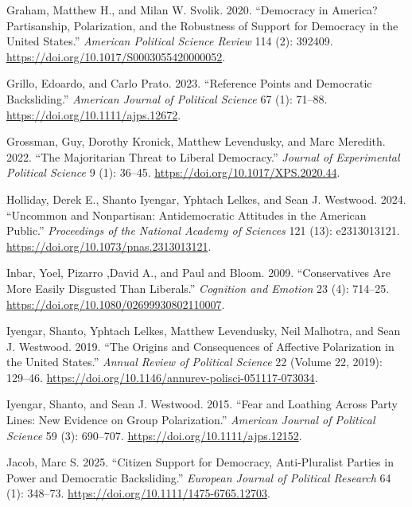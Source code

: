\documentclass[
  10pt,
  letterpaper,
  DIV=11,
  numbers=noendperiod]{scrartcl}
\newlength{\cslhangindent}
\newenvironment{CSLReferences}[2] %
 {\begin{list}{}{%
  \setlength{\itemindent}{0pt}
  \setlength{\leftmargin}{0pt}
  \setlength{\parsep}{0pt}
  \ifodd #1
   \setlength{\leftmargin}{\cslhangindent}
   \setlength{\itemindent}{-1\cslhangindent}
  \fi
  \setlength{\itemsep}{#2\baselineskip}}}
 {\end{list}}
\begin{document}
\begin{CSLReferences}{1}{0}
Graham, Matthew H., and Milan W. Svolik. 2020. {``Democracy in America?
Partisanship, Polarization, and the Robustness of Support for Democracy
in the United States.''} \emph{American Political Science Review} 114
(2): 392409. \url{https://doi.org/10.1017/S0003055420000052}.

Grillo, Edoardo, and Carlo Prato. 2023. {``Reference Points and
Democratic Backsliding.''} \emph{American Journal of Political Science}
67 (1): 71--88. \url{https://doi.org/10.1111/ajps.12672}.

Grossman, Guy, Dorothy Kronick, Matthew Levendusky, and Marc Meredith.
2022. {``The Majoritarian Threat to Liberal Democracy.''} \emph{Journal
of Experimental Political Science} 9 (1): 36--45.
\url{https://doi.org/10.1017/XPS.2020.44}.

Holliday, Derek E., Shanto Iyengar, Yphtach Lelkes, and Sean J.
Westwood. 2024. {``Uncommon and Nonpartisan: Antidemocratic Attitudes in
the American Public.''} \emph{Proceedings of the National Academy of
Sciences} 121 (13): e2313013121.
\url{https://doi.org/10.1073/pnas.2313013121}.

Inbar, Yoel, Pizarro ,David A., and Paul and Bloom. 2009.
{``Conservatives Are More Easily Disgusted Than Liberals.''}
\emph{Cognition and Emotion} 23 (4): 714--25.
\url{https://doi.org/10.1080/02699930802110007}.

Iyengar, Shanto, Yphtach Lelkes, Matthew Levendusky, Neil Malhotra, and
Sean J. Westwood. 2019. {``The Origins and Consequences of Affective
Polarization in the United States.''} \emph{Annual Review of Political
Science} 22 (Volume 22, 2019): 129--46.
\url{https://doi.org/10.1146/annurev-polisci-051117-073034}.

Iyengar, Shanto, and Sean J. Westwood. 2015. {``Fear and Loathing Across
Party Lines: New Evidence on Group Polarization.''} \emph{American
Journal of Political Science} 59 (3): 690--707.
\url{https://doi.org/10.1111/ajps.12152}.

Jacob, Marc S. 2025. {``Citizen Support for Democracy, Anti-Pluralist
Parties in Power and Democratic Backsliding.''} \emph{European Journal
of Political Research} 64 (1): 348--73.
\url{https://doi.org/10.1111/1475-6765.12703}.


\end{CSLReferences}
\end{document}
